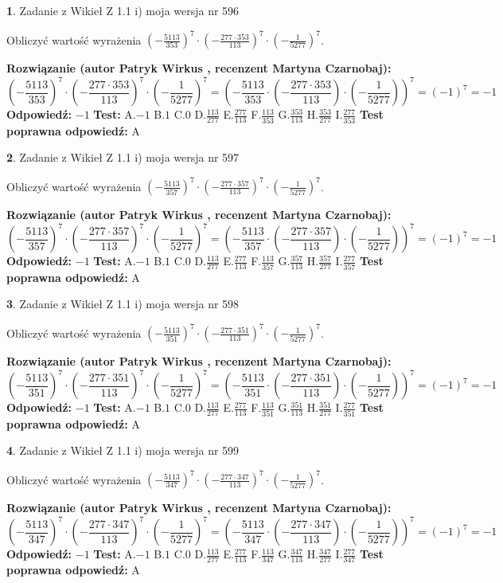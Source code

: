 \documentclass[12pt, a4paper]{article}
\theoremstyle{definition} %
\newtheorem{zad}{}
\newcommand{\zadStart}[1]{\begin{zad}#1\newline}
\newcommand{\zadStop}{\end{zad}}
\newcommand{\rozwStart}[2]{\noindent \textbf{Rozwiązanie (autor #1 , recenzent #2): }\newline}
\newcommand{\rozwStop}{\newline}
\newcommand{\odpStart}{\noindent \textbf{Odpowiedź:}\newline}
\newcommand{\odpStop}{\newline}
\newcommand{\testStart}{\noindent \textbf{Test:}\newline}
\newcommand{\testStop}{\newline}
\newcommand{\kluczStart}{\noindent \textbf{Test poprawna odpowiedź:}\newline}
\newcommand{\kluczStop}{\newline}
\begin{document}
\zadStart{Zadanie z Wikieł Z 1.1 i) moja wersja nr 596}

Obliczyć wartość wyrażenia $(-\frac{5113}{353})^{7} \cdot (-\frac{277 \cdot 353}{113})^{7} \cdot (-\frac{1}{5277})^{7}$.
\zadStop
\rozwStart{Patryk Wirkus}{Martyna Czarnobaj}
$$(-\frac{5113}{353})^{7} \cdot (-\frac{277 \cdot 353}{113})^{7} \cdot (-\frac{1}{5277})^{7} = (-\frac{5113}{353} \cdot (-\frac{277 \cdot 353}{113}) \cdot (-\frac{1}{5277}))^{7} = (-1)^{7} = -1$$
\rozwStop
\odpStart
$-1$
\odpStop
\testStart
A.$-1$ B.$1$ C.$0$ D.$\frac{113}{277}$ E.$\frac{277}{113}$
F.$\frac{113}{353}$ G.$\frac{353}{113}$
H.$\frac{353}{277}$
I.$\frac{277}{353}$
\testStop
\kluczStart
A
\kluczStop



\zadStart{Zadanie z Wikieł Z 1.1 i) moja wersja nr 597}

Obliczyć wartość wyrażenia $(-\frac{5113}{357})^{7} \cdot (-\frac{277 \cdot 357}{113})^{7} \cdot (-\frac{1}{5277})^{7}$.
\zadStop
\rozwStart{Patryk Wirkus}{Martyna Czarnobaj}
$$(-\frac{5113}{357})^{7} \cdot (-\frac{277 \cdot 357}{113})^{7} \cdot (-\frac{1}{5277})^{7} = (-\frac{5113}{357} \cdot (-\frac{277 \cdot 357}{113}) \cdot (-\frac{1}{5277}))^{7} = (-1)^{7} = -1$$
\rozwStop
\odpStart
$-1$
\odpStop
\testStart
A.$-1$ B.$1$ C.$0$ D.$\frac{113}{277}$ E.$\frac{277}{113}$
F.$\frac{113}{357}$ G.$\frac{357}{113}$
H.$\frac{357}{277}$
I.$\frac{277}{357}$
\testStop
\kluczStart
A
\kluczStop



\zadStart{Zadanie z Wikieł Z 1.1 i) moja wersja nr 598}

Obliczyć wartość wyrażenia $(-\frac{5113}{351})^{7} \cdot (-\frac{277 \cdot 351}{113})^{7} \cdot (-\frac{1}{5277})^{7}$.
\zadStop
\rozwStart{Patryk Wirkus}{Martyna Czarnobaj}
$$(-\frac{5113}{351})^{7} \cdot (-\frac{277 \cdot 351}{113})^{7} \cdot (-\frac{1}{5277})^{7} = (-\frac{5113}{351} \cdot (-\frac{277 \cdot 351}{113}) \cdot (-\frac{1}{5277}))^{7} = (-1)^{7} = -1$$
\rozwStop
\odpStart
$-1$
\odpStop
\testStart
A.$-1$ B.$1$ C.$0$ D.$\frac{113}{277}$ E.$\frac{277}{113}$
F.$\frac{113}{351}$ G.$\frac{351}{113}$
H.$\frac{351}{277}$
I.$\frac{277}{351}$
\testStop
\kluczStart
A
\kluczStop



\zadStart{Zadanie z Wikieł Z 1.1 i) moja wersja nr 599}

Obliczyć wartość wyrażenia $(-\frac{5113}{347})^{7} \cdot (-\frac{277 \cdot 347}{113})^{7} \cdot (-\frac{1}{5277})^{7}$.
\zadStop
\rozwStart{Patryk Wirkus}{Martyna Czarnobaj}
$$(-\frac{5113}{347})^{7} \cdot (-\frac{277 \cdot 347}{113})^{7} \cdot (-\frac{1}{5277})^{7} = (-\frac{5113}{347} \cdot (-\frac{277 \cdot 347}{113}) \cdot (-\frac{1}{5277}))^{7} = (-1)^{7} = -1$$
\rozwStop
\odpStart
$-1$
\odpStop
\testStart
A.$-1$ B.$1$ C.$0$ D.$\frac{113}{277}$ E.$\frac{277}{113}$
F.$\frac{113}{347}$ G.$\frac{347}{113}$
H.$\frac{347}{277}$
I.$\frac{277}{347}$
\testStop
\kluczStart
A
\kluczStop
\end{document}
